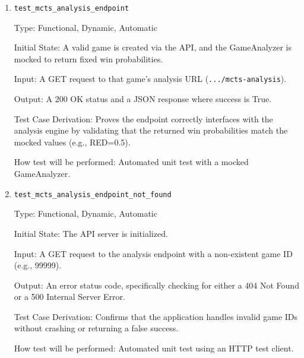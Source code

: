 \documentclass[12pt, titlepage]{article}
\begin{document}
\begin{enumerate}

\item
\texttt{test\_mcts\_analysis\_endpoint}

Type: Functional, Dynamic, Automatic

Initial State: A valid game is created via the API, and the GameAnalyzer is mocked to return fixed win probabilities.

Input: A GET request to that game's analysis URL (\texttt{.../mcts-analysis}).

Output: A 200 OK status and a JSON response where success is True.

Test Case Derivation: Proves the endpoint correctly interfaces with the analysis engine by validating that the returned win probabilities match the mocked values (e.g., RED=0.5).

How test will be performed: Automated unit test with a mocked GameAnalyzer.

\item
\texttt{test\_mcts\_analysis\_endpoint\_not\_found}

Type: Functional, Dynamic, Automatic

Initial State: The API server is initialized.

Input: A GET request to the analysis endpoint with a non-existent game ID (e.g., 99999).

Output: An error status code, specifically checking for either a 404 Not Found or a 500 Internal Server Error.

Test Case Derivation: Confirms that the application handles invalid game IDs without crashing or returning a false success.

How test will be performed: Automated unit test using an HTTP test client.

\end{enumerate}
\end{document}
